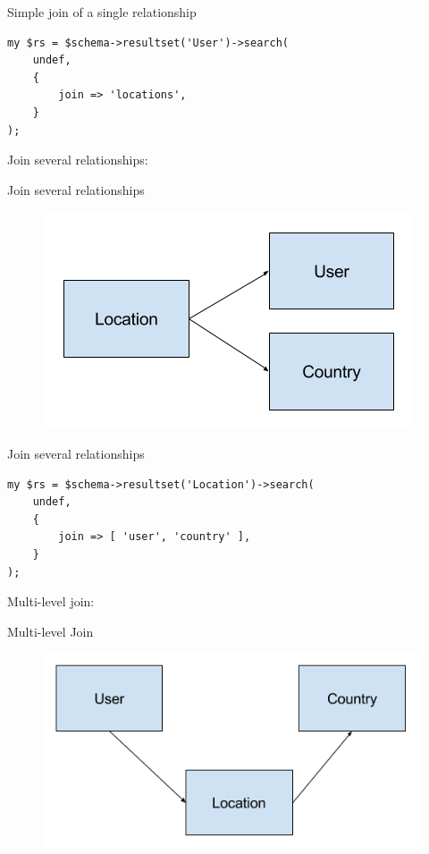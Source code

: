 \begin{frame}[fragile]{Simple join of a single relationship}

\begin{lstlisting}
my $rs = $schema->resultset('User')->search(
    undef,
    {
        join => 'locations',
    }
);
\end{lstlisting}
\end{frame}

Join several relationships:

\begin{frame}[fragile]{Join several relationships}
\begin{figure}[!ht]
\centering
\includegraphics[width=1\linewidth]{img/join-several.png}
\end{figure}
\end{frame}

\begin{frame}[fragile]{Join several relationships}

\begin{lstlisting}
my $rs = $schema->resultset('Location')->search(
    undef,
    {
        join => [ 'user', 'country' ],
    }
);
\end{lstlisting}
\end{frame}

Multi-level join:

\begin{frame}[fragile]{Multi-level Join}
\begin{figure}[!ht]
\centering
\includegraphics[width=1\linewidth]{img/join-multi-level.png}
\end{figure}
\end{frame}

